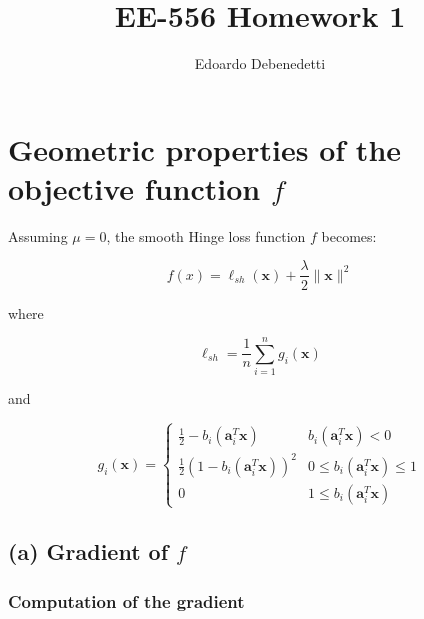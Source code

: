 \documentclass[12pt]{article}
\title{EE-556 Homework 1}
\author{Edoardo Debenedetti}
\newcommand{\xb}{\mathbf{x}}
\newcommand{\ab}{\mathbf{a}}
\newcommand{\abi}{\ab_i}
\newcommand{\xnorm}{\lVert \mathbf{\xb} \rVert}
\newcommand{\sumin}{\sum_{i = 1}^n}
\newcommand{\ellsh}{\ell_{sh}}
\newcommand{\ax}{\abi^T\xb}
\newcommand{\fracn}{\frac{1}{n}}
\newcommand{\linearpred}{b_i(\ax) < 0}
\newcommand{\quadrpred}{0 \leq b_i(\ax) \leq 1}
\begin{document}
\maketitle

\section{Geometric properties of the objective function $f$}

Assuming $\mu = 0$, the smooth Hinge loss function $f$ becomes:

\begin{equation} \label{def:hinge_loss}
    f(x) = \ellsh(\xb) + \frac{\lambda}{2} \xnorm ^ 2
\end{equation}

where

\begin{equation} \label{def:l}
    \ellsh = \fracn \sumin g_i(\xb)
\end{equation}

and

\begin{equation}
    g_i(\xb) = \begin{cases} \label{def:g}
    \frac{1}{2} - b_i(\ax)         & \linearpred \\
    \frac{1}{2}(1 - b_i(\ax))^2    & \quadrpred \\
    0                                   & 1 \le b_i(\ax)
\end{cases}
\end{equation}

\subsection*{(a) Gradient of $f$}

\subsubsection*{Computation of the gradient}
\label{subsubsec:det-gradient}
\end{document}
